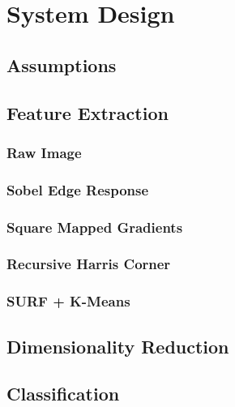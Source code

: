 \chapter{System Design}
\label{chap:design}

\section{Assumptions}


\section{Feature Extraction}

\subsection{Raw Image}

\subsection{Sobel Edge Response}

\subsection{Square Mapped Gradients}

\subsection{Recursive Harris Corner}

\subsection{SURF + K-Means}



\section{Dimensionality Reduction}

\section{Classification}



